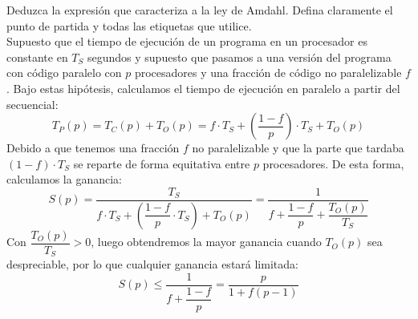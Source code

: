 \begin{cuestion}
    Deduzca la expresión que caracteriza a la ley de Amdahl. Defina claramente el punto de partida y todas las etiquetas que utilice.\\

    Supuesto que el tiempo de ejecución de un programa en un procesador es constante en $T_S$ segundos y supuesto que pasamos a una versión del programa con código paralelo con $p$ procesadores y una fracción de código no paralelizable $f$. Bajo estas hipótesis, calculamos el tiempo de ejecución en paralelo a partir del secuencial:
    \begin{equation*}
        T_P(p) = T_C(p) + T_O(p) = f\cdot T_S + \left(\dfrac{1-f}{p}\right)\cdot T_S + T_O(p)
    \end{equation*}
    Debido a que tenemos una fracción $f$ no paralelizable y que la parte que tardaba $(1-f)\cdot T_S$ se reparte de forma equitativa entre $p$ procesadores. De esta forma, calculamos la ganancia:
    \begin{equation*}
        S(p) = \dfrac{T_S}{f\cdot T_S + \left(\dfrac{1-f}{p}\cdot T_S\right) + T_O(p)} = \dfrac{1}{f + \dfrac{1-f}{p} + \dfrac{T_O(p)}{T_S}}   
    \end{equation*}
    Con $\dfrac{T_O(p)}{T_S} > 0$, luego obtendremos la mayor ganancia cuando $T_O(p)$ sea despreciable, por lo que cualquier ganancia estará limitada:
    \begin{equation*}
        S(p) \leq \dfrac{1}{f+\dfrac{1-f}{p}} = \dfrac{p}{1+f(p-1)}
    \end{equation*}
\end{cuestion}

